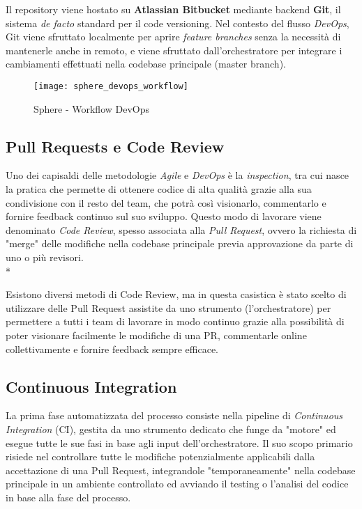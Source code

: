 \documentclass[../main.tex]{subfiles}
\begin{document}
        	    Il repository viene hostato su \textbf{Atlassian Bitbucket} mediante backend \textbf{Git}, il sistema \emph{de facto} standard per il code versioning. Nel contesto del flusso \emph{DevOps}, Git viene sfruttato localmente per aprire \emph{feature branches} senza la necessità di mantenerle anche in remoto, e viene sfruttato dall'orchestratore per integrare i cambiamenti effettuati nella codebase principale (master branch).
        	    
           	    \begin{figure}[H]
        			\centering
        			\texttt{[image: sphere\_devops\_workflow]}
        			\caption{Sphere - Workflow DevOps}
        			\label{fig:sphere_devops_workflow}
    	        \end{figure}     	
    	        
        	\subsection{Pull Requests e Code Review}
        	
        	    Uno dei capisaldi delle metodologie \emph{Agile} e \emph{DevOps} è la \emph{inspection}, tra cui nasce la pratica che permette di ottenere codice di alta qualità grazie alla sua condivisione con il resto del team, che potrà così visionarlo, commentarlo e fornire feedback continuo sul suo sviluppo. Questo modo di lavorare viene denominato \emph{Code Review}, spesso associata alla \emph{Pull Request}, ovvero la richiesta di "merge" delle modifiche nella codebase principale previa approvazione da parte di uno o più revisori.\\*
        	    
        	    Esistono diversi metodi di Code Review, ma in questa casistica è stato scelto di utilizzare delle Pull Request assistite da uno strumento (l'orchestratore) per permettere a tutti i team di lavorare in modo continuo grazie alla possibilità di poter visionare facilmente le modifiche di una PR, commentarle online collettivamente e fornire feedback sempre efficace.
        	
        	\subsection{Continuous Integration}
    	
    	        La prima fase automatizzata del processo consiste nella pipeline di \emph{Continuous Integration} (CI), gestita da uno strumento dedicato che funge da "motore" ed esegue tutte le sue fasi in base agli input dell'orchestratore. Il suo scopo primario risiede nel controllare tutte le modifiche potenzialmente applicabili dalla accettazione di una Pull Request, integrandole "temporaneamente" nella codebase principale in un ambiente controllato ed avviando il testing o l'analisi del codice in base alla fase del processo.
    	
\end{document}
